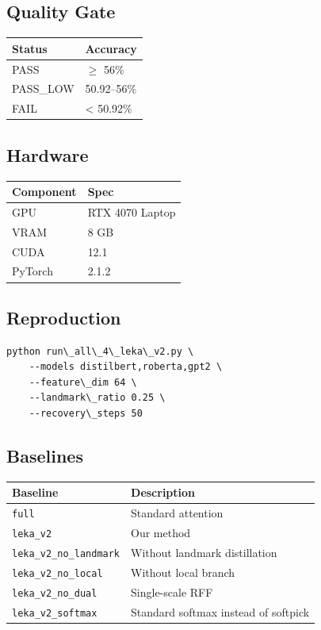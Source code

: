 \subsection{Quality Gate}

\begin{table}[H]
\centering
\small
\begin{tabular}{ll}
\toprule
\textbf{Status} & \textbf{Accuracy} \\
\midrule
PASS & $\ge$ 56\% \\
PASS\_LOW & 50.92--56\% \\
FAIL & \textless{} 50.92\% \\
\bottomrule
\end{tabular}
\end{table}

\subsection{Hardware}

\begin{table}[H]
\centering
\small
\begin{tabular}{ll}
\toprule
\textbf{Component} & \textbf{Spec} \\
\midrule
GPU & RTX 4070 Laptop \\
VRAM & 8 GB \\
CUDA & 12.1 \\
PyTorch & 2.1.2 \\
\bottomrule
\end{tabular}
\end{table}

\subsection{Reproduction}

\begin{lstlisting}
python run\_all\_4\_leka\_v2.py \
    --models distilbert,roberta,gpt2 \
    --feature\_dim 64 \
    --landmark\_ratio 0.25 \
    --recovery\_steps 50
\end{lstlisting}

\subsection{Baselines}

\begin{table}[H]
\centering
\small
\begin{tabular}{ll}
\toprule
\textbf{Baseline} & \textbf{Description} \\
\midrule
\texttt{full} & Standard attention \\
\texttt{leka\_v2} & Our method \\
\texttt{leka\_v2\_no\_landmark} & Without landmark distillation \\
\texttt{leka\_v2\_no\_local} & Without local branch \\
\texttt{leka\_v2\_no\_dual} & Single-scale RFF \\
\texttt{leka\_v2\_softmax} & Standard softmax instead of softpick \\
\bottomrule
\end{tabular}
\end{table}

